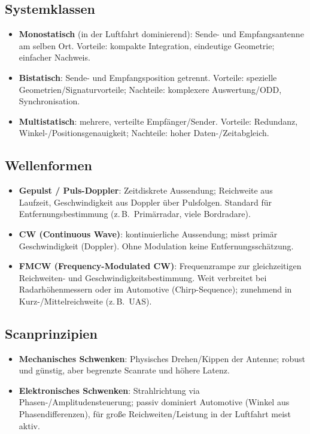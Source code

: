 \subsection{Systemklassen}
\begin{itemize}
  \item \textbf{Monostatisch} (in der Luftfahrt dominierend): Sende- und Empfangsantenne am selben Ort.
        Vorteile: kompakte Integration, eindeutige Geometrie; einfacher Nachweis. 
  \item \textbf{Bistatisch}: Sende- und Empfangsposition getrennt. 
        Vorteile: spezielle Geometrien/Signaturvorteile; Nachteile: komplexere Auswertung/ODD, Synchronisation.
  \item \textbf{Multistatisch}: mehrere, verteilte Empfänger/Sender. 
        Vorteile: Redundanz, Winkel-/Positionsgenauigkeit; Nachteile: hoher Daten-/Zeitabgleich.
\end{itemize}

\subsection{Wellenformen}
\begin{itemize}
  \item \textbf{Gepulst / Puls-Doppler}: Zeitdiskrete Aussendung; Reichweite aus Laufzeit, Geschwindigkeit aus Doppler über Pulsfolgen.
        Standard für Entfernungsbestimmung (z.\,B.\ Primärradar, viele Bordradare).
  \item \textbf{CW (Continuous Wave)}: kontinuierliche Aussendung; misst primär Geschwindigkeit (Doppler).
        Ohne Modulation keine Entfernungsschätzung.
  \item \textbf{FMCW (Frequency-Modulated CW)}: Frequenzrampe zur gleichzeitigen Reichweiten- und Geschwindigkeitsbestimmung.
        Weit verbreitet bei Radarhöhenmessern oder im Automotive (Chirp-Sequence); zunehmend in Kurz-/Mittelreichweite (z.\,B.\ UAS).
\end{itemize}
\subsection{Scanprinzipien}
\begin{itemize}
  \item \textbf{Mechanisches Schwenken}: Physisches Drehen/Kippen der Antenne; robust und günstig, aber begrenzte Scanrate und höhere Latenz.
  \item \textbf{Elektronisches Schwenken}: Strahlrichtung via Phasen-/Amplitudensteuerung; passiv 
  dominiert Automotive (Winkel aus Phasendifferenzen), für große Reichweiten/Leistung in der Luftfahrt meist aktiv.
\end{itemize}


